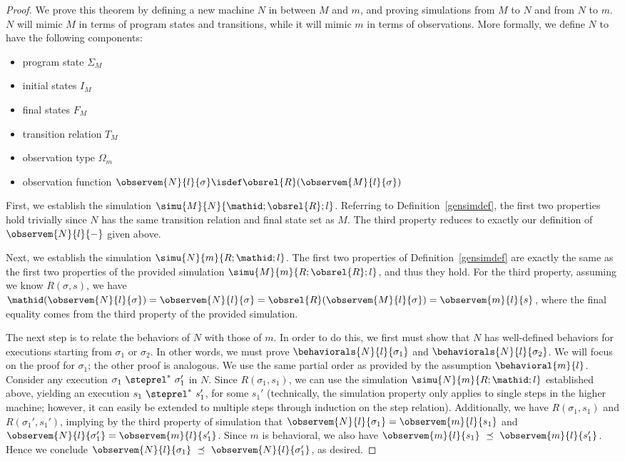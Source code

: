 \begin{proof}
We prove this theorem by defining a new machine $N$ in between $M$
and $m$, and proving simulations from $M$ to $N$ and from $N$
to $m$. $N$ will mimic $M$ in terms of program states
and transitions, while it will mimic $m$ in terms of observations.
More formally, we define $N$ to have the following components:
\begin{itemize}
\item program state $\Sigma_M$
\item initial states $I_M$
\item final states $F_M$
\item transition relation $T_M$
\item observation type $\Omega_m$
\item observation function 
$\observem{N}{l}{\sigma} \isdef \obsrel{R}(\observem{M}{l}{\sigma})$
\end{itemize}

First, we establish the simulation $\simu{M}{N}{\mathid;\obsrel{R};l}$.
Referring to Definition~\ref{gensimdef}, the first two properties hold
trivially since $N$ has the same transition relation and final
state set as $M$. The third property reduces to exactly our
definition of $\observem{N}{l}{-}$ given above.

Next, we establish the simulation $\simu{N}{m}{R;\mathid;l}$. The
first two properties of Definition~\ref{gensimdef} are exactly
the same as the first two properties of the provided simulation
$\simu{M}{m}{R;\obsrel{R};l}$, and thus they hold. For the third
property, assuming we know $R(\sigma,s)$, we have 
$\mathid(\observem{N}{l}{\sigma}) = 
\observem{N}{l}{\sigma} = \obsrel{R}(\observem{M}{l}{\sigma})
= \observem{m}{l}{s}$, where the final equality comes from
the third property of the provided simulation.

The next step is to relate the behaviors of $N$ with those of
$m$. In order to do this, we first must show that $N$ has 
well-defined behaviors for executions starting from $\sigma_1$
or $\sigma_2$. In other words, we must prove 
$\behaviorals{N}{l}{\sigma_1}$ and $\behaviorals{N}{l}{\sigma_2}$.
We will focus on the proof for $\sigma_1$; the other proof is
analogous. We use the same partial order as provided
by the assumption $\behavioral{m}{l}$.
Consider any execution $\sigma_1~\steprel^*~\sigma_1'$ in $N$.
Since $R(\sigma_1,s_1)$, we can use the simulation 
$\simu{N}{m}{R;\mathid;l}$ established above, yielding an execution
$s_1~\steprel^*~s_1'$, for some $s_1'$ (technically, the simulation 
property only applies to single steps in the higher machine; 
however, it can easily be extended to multiple steps
through induction on the step relation). Additionally, we have 
$R(\sigma_1,s_1)$ and $R(\sigma_1',s_1')$, implying by the third property 
of simulation that $\observem{N}{l}{\sigma_1} = \observem{m}{l}{s_1}$ and 
$\observem{N}{l}{\sigma_1'} = \observem{m}{l}{s_1'}$.
Since $m$ is behavioral, we also have 
$\observem{m}{l}{s_1}~\preceq~\observem{m}{l}{s_1'}$. Hence we conclude
$\observem{N}{l}{\sigma_1}~\preceq~\observem{N}{l}{\sigma_1'}$, as desired.


\end{proof}
